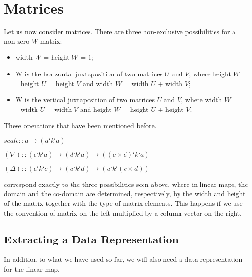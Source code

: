 \documentclass[11pt,a4]{article}
\newcommand{\Varid}[1]{\mathit{#1}}
\theoremstyle{definition}
\theoremstyle{Definition}
\theoremstyle{Definition}
\begin{document}
	\newpage
	
	\section{Matrices}
	Let us now consider matrices. There are three non-exclusive possibilities for a non-zero $W$ matrix:
	\begin{itemize}
		\item width $W$ = height $W$ = $1$;
		\item W is the horizontal juxtaposition of two matrices $U$ and $V$, where height $W$ =\newline height $U$ = height $V$ and width $W$ = width $U$ $+$ width $V$;
		\item W is the vertical juxtaposition of two matrices $U$ and $V$, where width $W$ =\newline width $U$ = width $V$ and height $W$ = height $U$ $+$ height $V$.
	\end{itemize}
	
	These operations that have been mentioned before,

	\ensuremath{\Varid{scale}\mathbin{::}\Varid{a}\rightarrow (\Varid{a}\mathbin{‘}\Varid{k}\mathbin{‘}\Varid{a})}
    
    \ensuremath{( \nabla )\mathbin{::}(\Varid{c}\mathbin{‘}\Varid{k}\mathbin{‘}\Varid{a})\rightarrow (\Varid{d}\mathbin{‘}\Varid{k}\mathbin{‘}\Varid{a})\rightarrow ((\Varid{c} \times \Varid{d})\mathbin{‘}\Varid{k}\mathbin{‘}\Varid{a})}

    \ensuremath{( \Delta )\mathbin{::}(\Varid{a}\mathbin{‘}\Varid{k}\mathbin{‘}\Varid{c})\rightarrow (\Varid{a}\mathbin{‘}\Varid{k}\mathbin{‘}\Varid{d})\rightarrow (\Varid{a}\mathbin{‘}\Varid{k}\mathbin{‘}(\Varid{c} \times \Varid{d}))}	
    

	correspond exactly to the three possibilities seen above, where in linear maps, the domain and the co-domain are determined, respectively, by the width and height of the matrix together with the type of matrix elements. This happens if we use the convention of matrix on the left multiplied by a column vector on the right.
	
	\subsection{Extracting a Data Representation}
	
	In addition to what we have used so far, we will also need a data representation for the linear map.
	
\end{document}
